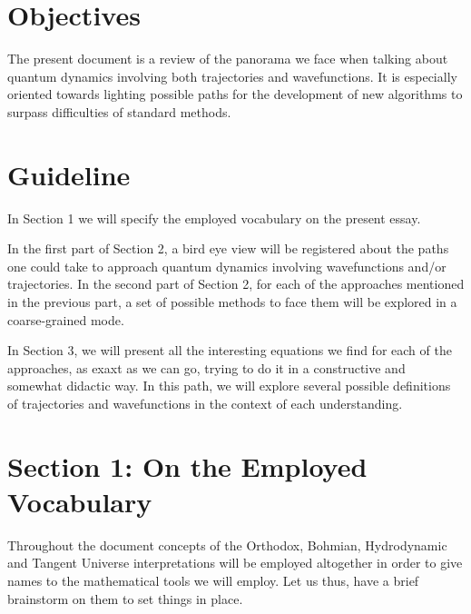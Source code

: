 \documentclass[11pt, a4paper]{article} %
\begin{document}
%
\pagestyle{fancy}
\section*{Objectives}\vspace{-0.2cm}
The present document is a review of the panorama we face when talking about quantum dynamics involving both trajectories and wavefunctions. It is especially oriented towards lighting possible paths for the development of new algorithms to surpass difficulties of standard methods.


\section*{Guideline}\vspace{-0.2cm}

In Section 1 we will specify the employed vocabulary on the present essay. 

In the first part of Section 2, a bird eye view will be registered about the paths one could take to approach quantum dynamics involving wavefunctions and/or trajectories. In the second part of Section 2, for each of the approaches mentioned in the previous part, a set of possible methods to face them will be explored in a coarse-grained mode.

In Section 3, we will present all the interesting equations we find for each of the approaches, as exaxt as we can go, trying to do it in a constructive and somewhat didactic way. In this path, we will explore several possible definitions of trajectories and wavefunctions in the context of each understanding.


\section*{Section 1: On the Employed Vocabulary}

Throughout the document concepts of the Orthodox, Bohmian, Hydrodynamic and Tangent Universe interpretations will be employed altogether in order to give names to the mathematical tools we will employ. Let us thus, have a brief brainstorm on them to set things in place.
\end{document}
